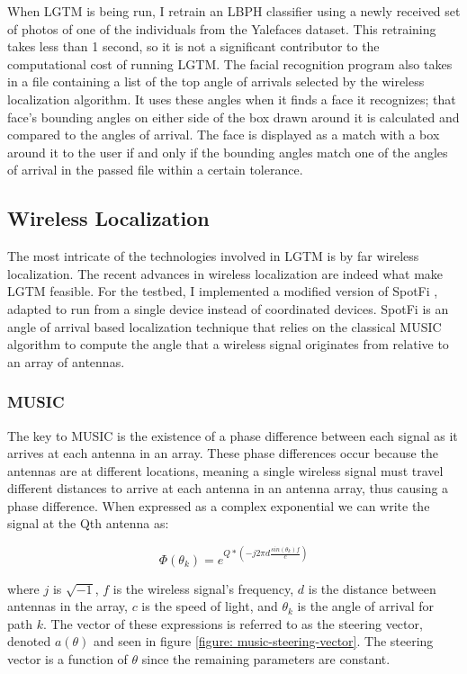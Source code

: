 \documentclass[12pt]{report}
\begin{document}
When LGTM is being run, I retrain an LBPH classifier using a newly received set of photos of one of the individuals from the Yalefaces dataset. This retraining takes less than 1 second, so it is not a significant contributor to the computational cost of running LGTM. The facial recognition program also takes in a file containing a list of the top angle of arrivals selected by the wireless localization algorithm. It uses these angles when it finds a face it recognizes; that face's bounding angles on either side of the box drawn around it is calculated and compared to the angles of arrival. The face is displayed as a match with a box around it to the user if and only if the bounding angles match one of the angles of arrival in the passed file within a certain tolerance. \par

\subsection{Wireless Localization}
The most intricate of the technologies involved in LGTM is by far wireless localization. The recent advances in wireless localization \cite{UbicarseKumar2014,SpotFiKotaru2015,ChronosSingleAPLocalizationVasisht2016} are indeed what make LGTM feasible. For the testbed, I implemented a modified version of SpotFi \cite{SpotFiKotaru2015}, adapted to run from a single device instead of coordinated devices. SpotFi is an angle of arrival based localization technique that relies on the classical MUSIC algorithm \cite{MUSICSchmidt1986} to compute the angle that a wireless signal originates from relative to an array of antennas. 

\subsubsection{MUSIC}
The key to MUSIC is the existence of a phase difference between each signal as it arrives at each antenna in an array. These phase differences occur because the antennas are at different locations, meaning a single wireless signal must travel different distances to arrive at each antenna in an antenna array, thus causing a phase difference. When expressed as a complex exponential we can write the signal at the Qth antenna as:

$$\Phi(\theta_{k}) = e^{Q * (-j 2 \pi d \frac{sin(\theta_{k}) f}{c})}$$

where $j$ is $\sqrt{-1}$, $f$ is the wireless signal's frequency, $d$ is the distance between antennas in the array, $c$ is the speed of light, and $\theta_k$ is the angle of arrival for path $k$. The vector of these expressions is referred to as the steering vector, denoted $a(\theta)$ and seen in figure \ref{figure: music-steering-vector}. The steering vector is a function of $\theta$ since the remaining parameters are constant. \par
\end{document}
